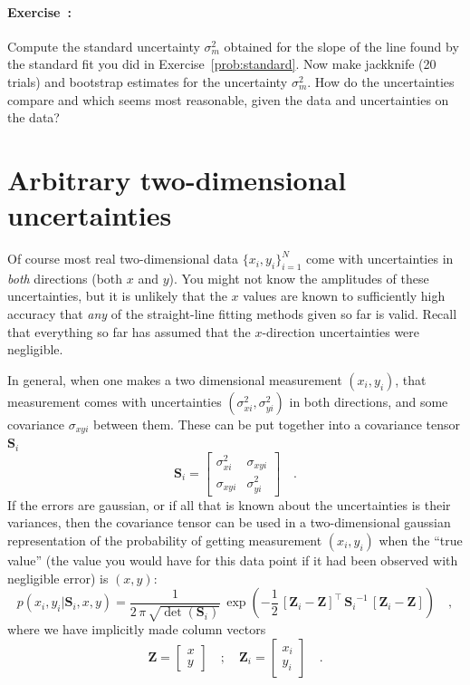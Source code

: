 \documentclass[12pt,twoside]{article}
\newcommand{\problemname}{Exercise}
\newcounter{problem}
\newenvironment{problem}{\paragraph{\problemname~\theproblem:}\refstepcounter{problem}}{}
\newcommand{\mmatrix}[1]{\boldsymbol{#1}}
\newcommand{\inverse}[1]{{#1}^{-1}}
\newcommand{\transpose}[1]{{#1}^{\scriptscriptstyle \top}}
\newcommand{\mS}{\mmatrix{S}}
\newcommand{\mZ}{\mmatrix{Z}}
\newcommand{\setofall}[3]{\{{#1}\}_{{#2}}^{{#3}}}
\newcommand{\allxy}{\setofall{x_i,y_i}{i=1}{N}}
\begin{document}
\begin{problem}
Compute the standard uncertainty $\sigma_m^2$ obtained for the slope
of the line found by the standard fit you did in
\problemname~\ref{prob:standard}.  Now make jackknife (20 trials) and
bootstrap estimates for the uncertainty $\sigma_m^2$.  How do the
uncertainties compare and which seems most reasonable, given the data
and uncertainties on the data?
\end{problem}

\section{Arbitrary two-dimensional uncertainties}\label{sec:twod}

Of course most real two-dimensional data $\allxy$ come with
uncertainties in \emph{both} directions (both $x$ and $y$).  You might
not know the amplitudes of these uncertainties, but it is unlikely
that the $x$ values are known to sufficiently high accuracy that
\emph{any} of the straight-line fitting methods given so far is valid.
Recall that everything so far has assumed that the $x$-direction
uncertainties were negligible.

In general, when one makes a two dimensional measurement $(x_i,y_i)$,
that measurement comes with uncertainties $(\sigma_{xi}^2,\sigma_{yi}^2)$
in both directions, and some covariance $\sigma_{xyi}$ between them.
These can be put together into a covariance tensor $\mS_i$
\begin{equation}
\mS_i = \left[\begin{array}{cc}
\sigma_{xi}^2 & \sigma_{xyi} \\ \sigma_{xyi} & \sigma_{yi}^2
\end{array}\right] \quad .
\end{equation}
If the errors are gaussian, or if all that is known about the
uncertainties is their variances, then the covariance tensor can be
used in a two-dimensional gaussian representation of the probability
of getting measurement $(x_i,y_i)$ when the ``true value'' (the value
you would have for this data point if it had been observed with
negligible error) is $(x,y)$:
\begin{equation}
p(x_i,y_i|\mS_i,x,y) = \frac{1}{2\,\pi\,\sqrt{\det(\mS_i)}}
  \,\exp\left(-\frac{1}{2}\,\transpose{\left[\mZ_i - \mZ\right]}
  \,\inverse{\mS_i}\,\left[\mZ_i - \mZ\right]\right) \quad ,
\end{equation}
where we have implicitly made column vectors
\begin{equation}\label{eq:mZ}
\mZ = \left[\begin{array}{c} x \\ y \end{array}\right] \quad ; \quad
\mZ_i = \left[\begin{array}{c} x_i \\ y_i \end{array}\right] \quad .
\end{equation}
\end{document}

